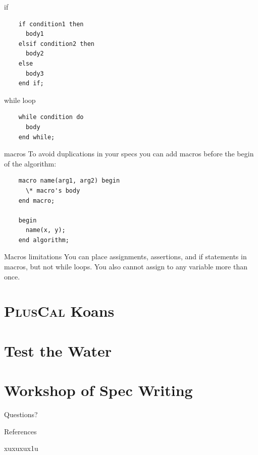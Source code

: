 \documentclass[10pt]{beamer}
\newcommand{\pluscal}{\textbf{\textsc{PlusCal}}\xspace}
\begin{document}
\begin{frame}[fragile]{if}
  \begin{verbatim}
    if condition1 then
      body1
    elsif condition2 then
      body2
    else
      body3
    end if;
  \end{verbatim}
\end{frame}

\begin{frame}[fragile]{while loop}
  \begin{verbatim}
    while condition do
      body
    end while;
  \end{verbatim}
\end{frame}

\begin{frame}[fragile]{macros}
  To avoid duplications in your specs you can add macros before the begin of the algorithm:
  
  \begin{verbatim}
    macro name(arg1, arg2) begin
      \* macro's body
    end macro;

    begin
      name(x, y);
    end algorithm;
  \end{verbatim}

  \begin{alertblock}{Macros limitations}
    You can place assignments, assertions, and if statements in macros, but not while loops. You also cannot assign to any variable more than once.
  \end{alertblock}
\end{frame}

\section{\pluscal Koans}



\section{Test the Water}

\section{Workshop of Spec Writing}


\begin{frame}[standout]
  Questions?
\end{frame}

\appendix

\begin{frame}[allowframebreaks]{References}

  \nocite{*}
  xuxuxux1u
  

\end{frame}
\end{document}
